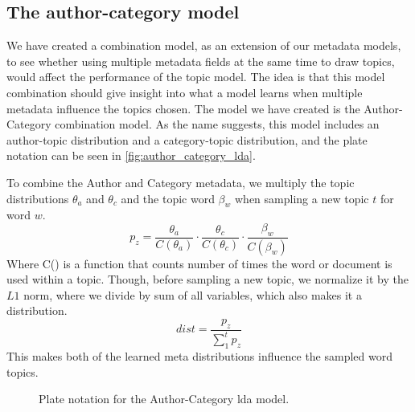 \subsection{The author-category model}\label{sec:combination}
We have created a combination model, as an extension of our metadata models, to see whether using multiple metadata fields at the same time to draw topics, would affect the performance of the topic model.
The idea is that this model combination should give insight into what a model learns when multiple metadata influence the topics chosen.
The model we have created is the Author-Category combination model.
As the name suggests, this model includes an author-topic distribution and a category-topic distribution, and the plate notation can be seen in \autoref{fig:author_category_lda}.

To combine the Author and Category metadata, we multiply the topic distributions $\theta_a$ and $\theta_c$ and the topic word $\beta_w$ when sampling a new topic $t$ for word $w$.
\begin{equation}
	p_z = \frac{\theta_a}{C(\theta_a)} \cdot \frac{\theta_c}{C(\theta_c)} \cdot \frac{\beta_w}{C(\beta_w)}
\end{equation}
Where C() is a function that counts number of times the word or document is used within a topic.
Though, before sampling a new topic, we normalize it by the $L1$ norm, where we divide by sum of all variables, which also makes it a distribution. 
\begin{equation}
	dist = \frac{p_z}{\sum_{1}^{t} p_z}
\end{equation}
This makes both of the learned meta distributions influence the sampled word topics.

\begin{figure*}[ht]
	\centering
	\resizebox{.3\textwidth}{!}{%
		
	}
	\caption{Plate notation for the Author-Category \gls{lda} model.}
	\label{fig:author_category_lda}
\end{figure*}



